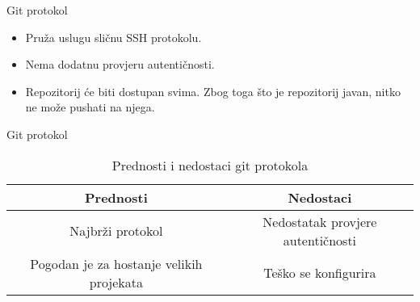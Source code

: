 \documentclass[10pt]{beamer}
\begin{document}
	\begin{frame}{Git protokol}
		\begin{itemize}
			\item Pruža uslugu sličnu SSH protokolu.
			\item Nema dodatnu provjeru autentičnosti.
			\item Repozitorij će biti dostupan svima.
			Zbog toga što je repozitorij javan, nitko ne može pushati na njega.
		\end{itemize}
	\end{frame}

	\begin{frame}{Git protokol}
		\begin{table}
			\caption{Prednosti i nedostaci git protokola}
			\begin{tabular}{||c|c||}
				\hline
				\textbf{Prednosti} & \textbf{Nedostaci} \\ \hline
				Najbrži protokol & Nedostatak provjere autentičnosti \\
				Pogodan je za hostanje velikih projekata & Teško se konfigurira\\  
				\hline
			\end{tabular}
		\end{table}
	\end{frame}
\end{document}
